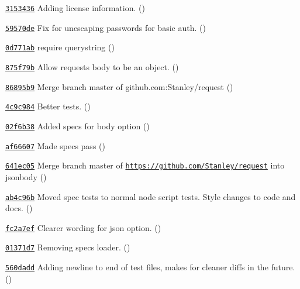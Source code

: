 \begin{DoxyItemize}
\item \href{https://github.com/mikeal/request/commit/3153436404fca865a65649d46eb22d9797128c9d}{\tt 3153436} Adding license information. ()
\item \href{https://github.com/mikeal/request/commit/59570dec37913c7e530303a83f03781d9aca958c}{\tt 59570de} Fix for unescaping passwords for basic auth. ()
\item \href{https://github.com/mikeal/request/commit/0d771ab7882b97d776179972c51c59386f91b953}{\tt 0d771ab} require querystring ()
\item \href{https://github.com/mikeal/request/commit/875f79b6a40340457fafafdadac813cfa5343689}{\tt 875f79b} Allow request\textquotesingle{}s body to be an object. ()
\item \href{https://github.com/mikeal/request/commit/86895b9c37f7b412b7df963c2a75361ff402d8c5}{\tt 86895b9} Merge branch \textquotesingle{}master\textquotesingle{} of github.\+com\+:Stanley/request ()
\item \href{https://github.com/mikeal/request/commit/4c9c984cb37bfd4e901ce24b0e9b283604c27bf4}{\tt 4c9c984} Better tests. ()
\item \href{https://github.com/mikeal/request/commit/02f6b38c1697a55ed43940d1fd0bef6225d4faa2}{\tt 02f6b38} Added specs for body option ()
\item \href{https://github.com/mikeal/request/commit/af666072a22b8df4d75fe71885139059f56ea5ee}{\tt af66607} Made specs pass ()
\item \href{https://github.com/mikeal/request/commit/641ec052dd95797816e781b2c3ac2524841db7cb}{\tt 641ec05} Merge branch \textquotesingle{}master\textquotesingle{} of \href{https://github.com/Stanley/request}{\tt https\+://github.\+com/\+Stanley/request} into jsonbody ()
\item \href{https://github.com/mikeal/request/commit/ab4c96be1c002c10806d967a4b266543f8b0267c}{\tt ab4c96b} Moved spec tests to normal node script tests. Style changes to code and docs. ()
\item \href{https://github.com/mikeal/request/commit/fc2a7ef301c1266938a5aeb539e4f3fc3b5191dd}{\tt fc2a7ef} Clearer wording for json option. ()
\item \href{https://github.com/mikeal/request/commit/01371d728082e22aabeb840da82a30aec62d7d8a}{\tt 01371d7} Removing specs loader. ()
\item \href{https://github.com/mikeal/request/commit/560dadd6cbd293622c66cd82b5506704c9850b13}{\tt 560dadd} Adding newline to end of test files, makes for cleaner diffs in the future. ()

\end{DoxyItemize}
